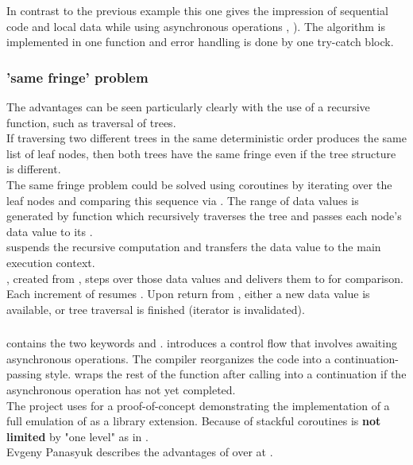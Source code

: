 In contrast to the previous example this one gives the impression of sequential
code and local data while using asynchronous operations \asyncread,
\asyncwrite). The algorithm is implemented in one function and error handling is
done by one try-catch block.

\subsubsection*{'same fringe' problem}
The advantages can be seen particularly clearly with the use of a recursive
function, such as traversal of trees.\\
If traversing two different trees in the same deterministic order produces the
same list of leaf nodes, then both trees have the same fringe even if the tree
structure is different.\\
\newline
The same fringe problem could be solved using coroutines by iterating over the
leaf nodes and comparing this sequence via . The range of data
values is generated by function  which recursively traverses the
tree and passes each node's data value to its \pushcoro.\\
\pushcoro suspends the recursive computation and transfers the data value to
the main execution context.\\
\pullcoroiterator, created from \pullcoro, steps over those data values and
delivers them to  for comparison. Each increment of \pullcoroiterator
resumes . Upon return from , either
a new data value is available, or tree traversal is finished (iterator is
invalidated).

\subsubsection*{\csharp \await}
\csharp contains the two keywords \async and \await. \async introduces a
control flow that involves awaiting asynchronous operations. The compiler
reorganizes the code into a continuation-passing style. \await wraps the rest
of the function after calling \await into a continuation if the asynchronous
operation has not yet completed.\\
The project \awaitemu uses \boostcoroutine for a proof-of-concept
demonstrating the implementation of a full emulation of \csharp \await as a
library extension. Because of stackful coroutines \await is \textbf{not limited}
by "one level" as in \csharp.\\
Evgeny Panasyuk describes the advantages of \boostcoroutine over \await at
\channelnine.
